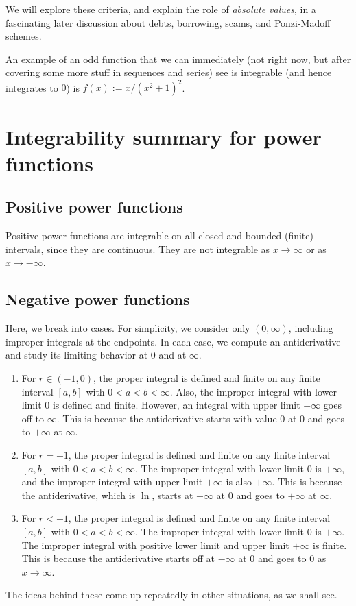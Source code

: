 \documentclass[10pt]{amsart}
\begin{document}
We will explore these criteria, and explain the role of {\em absolute
values}, in a fascinating later discussion about debts, borrowing,
scams, and Ponzi-Madoff schemes.

An example of an odd function that we can immediately (not right now,
but after covering some more stuff in sequences and series) see is
integrable (and hence integrates to $0$) is $f(x) := x/(x^2 + 1)^2$.

\section{Integrability summary for power functions}

\subsection{Positive power functions}

Positive power functions are integrable on all closed and bounded
(finite) intervals, since they are continuous. They are not integrable
as $x \to \infty$ or as $x \to -\infty$.

\subsection{Negative power functions}

Here, we break into cases. For simplicity, we consider only
$(0,\infty)$, including improper integrals at the endpoints. In each
case, we compute an antiderivative and study its limiting behavior at
$0$ and at $\infty$.

\begin{enumerate}
\item For $r \in (-1,0)$, the proper integral is defined and finite on
  any finite interval $[a,b]$ with $0 < a < b < \infty$. Also, the
  improper integral with lower limit $0$ is defined and
  finite. However, an integral with upper limit $+\infty$ goes off to
  $\infty$. This is because the antiderivative starts with value $0$
  at $0$ and goes to $+\infty$ at $\infty$.
\item For $r = -1$, the proper integral is defined and finite on any
  finite interval $[a,b]$ with $0 < a < b < \infty$. The improper
  integral with lower limit $0$ is $+\infty$, and the improper
  integral with upper limit $+\infty$ is also $+\infty$. This is
  because the antiderivative, which is $\ln$, starts at $-\infty$ at
  $0$ and goes to $+\infty$ at $\infty$.
\item For $r < -1$, the proper integral is defined and finite on any
  finite interval $[a,b]$ with $0 < a < b < \infty$. The improper
  integral with lower limit $0$ is $+\infty$. The improper integral
  with positive lower limit and upper limit $+\infty$ is finite. This
  is because the antiderivative starts off at $-\infty$ at $0$ and
  goes to $0$ as $x \to \infty$.
\end{enumerate}

The ideas behind these come up repeatedly in other situations, as we
shall see.
\end{document}
